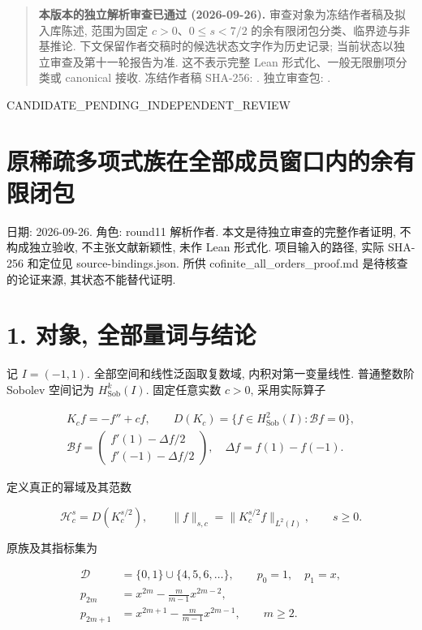 \documentclass[UTF8,fontset=fandol,11pt,a4paper]{ctexart}
\begin{document}
\begin{quote}\small
\textbf{本版本的独立解析审查已通过 (2026-09-26).}
审查对象为冻结作者稿及拟入库陈述, 范围为固定 $c>0$、$0\le s<7/2$ 的余有限闭包分类、临界迹与非基推论.
下文保留作者交稿时的候选状态文字作为历史记录; 当前状态以独立审查及第十一轮报告为准.
这不表示完整 Lean 形式化、一般无限删项分类或 canonical 接收.
冻结作者稿 SHA-256: .
独立审查包: .
\end{quote}

CANDIDATE\_PENDING\_INDEPENDENT\_REVIEW


\section*{原稀疏多项式族在全部成员窗口内的余有限闭包}

日期: 2026-09-26. 角色: round11 解析作者. 本文是待独立审查的完整作者证明, 不构成独立验收, 不主张文献新颖性, 未作 Lean 形式化. 项目输入的路径, 实际 SHA-256 和定位见 source-bindings.json. 所供 cofinite\_all\_orders\_proof.md 是待核查的论证来源, 其状态不能替代证明.


\section*{1. 对象, 全部量词与结论}

记 \(I=(-1,1)\). 全部空间和线性泛函取复数域, 内积对第一变量线性. 普通整数阶 Sobolev 空间记为 \(H_{\mathrm{Sob}}^k(I)\). 固定任意实数 \(c>0\), 采用实际算子


\[
\begin{gathered}
 K_cf=-f''+cf,\qquad
 D(K_c)=\{f\in H_{\mathrm{Sob}}^2(I):\mathcal Bf=0\},
 \\
 \mathcal Bf=
 \begin{pmatrix}f'(1)-\Delta f/2\\f'(-1)-\Delta f/2\end{pmatrix},
 \quad \Delta f=f(1)-f(-1).
\end{gathered}
 \tag{1.1}
\]


定义真正的幂域及其范数


\[
 \mathcal H_c^s=D(K_c^{s/2}),\qquad
 \|f\|_{s,c}=\|K_c^{s/2}f\|_{L^2(I)},\qquad s\ge0.
 \tag{1.2}
\]


原族及其指标集为


\[
 \begin{split}
 \mathcal D&=\{0,1\}\cup\{4,5,6,\ldots\},\qquad p_0=1,\quad p_1=x,\\
 p_{2m}&=x^{2m}-\frac m{m-1}x^{2m-2},\\
 p_{2m+1}&=x^{2m+1}-\frac m{m-1}x^{2m-1},\qquad m\ge2.
 \end{split}
 \tag{1.3}
\]
\end{document}
